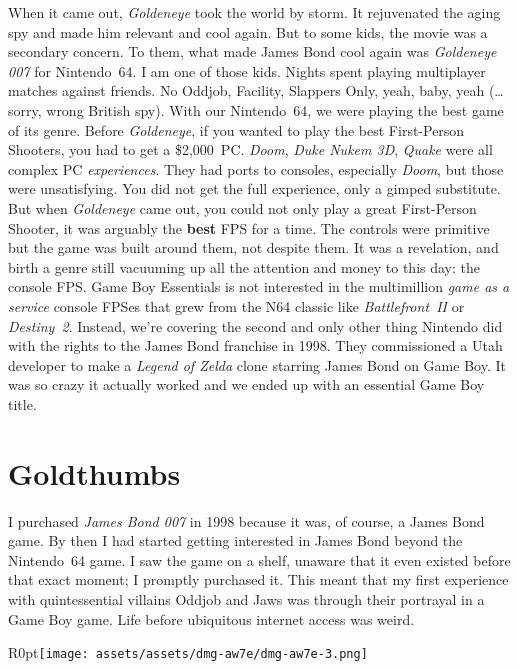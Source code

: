 \documentclass{book}
\begin{document}
When it came out, \emph{Goldeneye} took the world by storm. It rejuvenated the aging spy and made him relevant and cool again. But to some kids, the movie was a secondary concern. To them, what made James Bond cool again was \emph{Goldeneye 007} for Nintendo~64. I am one of those kids. Nights spent playing multiplayer matches against friends. No Oddjob, Facility, Slappers Only, yeah, baby, yeah (… sorry, wrong British spy). With our Nintendo~64, we were playing the best game of its genre. Before \emph{Goldeneye}, if you wanted to play the best First-Person Shooters, you had to get a \$2,000~PC. \emph{Doom}, \emph{Duke Nukem 3D}, \emph{Quake} were all complex PC \emph{experiences}. They had ports to consoles, especially \emph{Doom}, but those were unsatisfying. You did not get the full experience, only a gimped substitute. But when \emph{Goldeneye} came out, you could not only play a great First-Person Shooter, it was arguably the \textbf{best} FPS for a time. The controls were primitive but the game was built around them, not despite them. It was a revelation, and birth a genre still vacuuming up all the attention and money to this day: the console FPS. Game Boy Essentials is not interested in the multimillion \emph{game as a service} console FPSes that grew from the N64 classic like \emph{Battlefront~II} or \emph{Destiny~2}. Instead, we’re covering the second and only other thing Nintendo did with the rights to the James Bond franchise in 1998. They commissioned a Utah developer to make a \emph{Legend of Zelda} clone starring James Bond on Game Boy. It was so crazy it actually worked and we ended up with an essential Game Boy title.\par
\FloatBarrier\section*{Goldthumbs}
I purchased \emph{James Bond 007} in 1998 because it was, of course, a James Bond game. By then I had started getting interested in James Bond beyond the Nintendo~64 game. I saw the game on a shelf, unaware that it even existed before that exact moment; I promptly purchased it. This meant that my first experience with quintessential villains Oddjob and Jaws was through their portrayal in a Game Boy game. Life before ubiquitous internet access was weird.\par
\begin{wrapfigure}{R}{0pt}{\texttt{[image: assets/assets/dmg-aw7e/dmg-aw7e-3.png]}}\end{wrapfigure}
\end{document}
